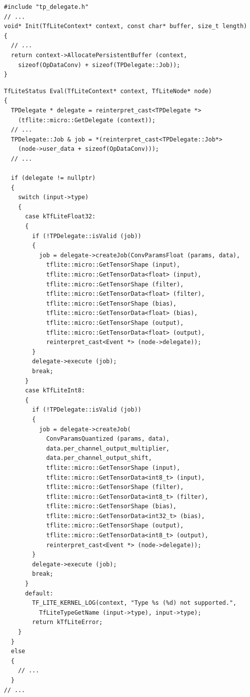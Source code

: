\begin{lstlisting}
#include "tp_delegate.h"
// ...
void* Init(TfLiteContext* context, const char* buffer, size_t length)
{
  // ...
  return context->AllocatePersistentBuffer (context, 
    sizeof(OpDataConv) + sizeof(TPDelegate::Job));
}
\end{lstlisting}

\begin{lstlisting}
TfLiteStatus Eval(TfLiteContext* context, TfLiteNode* node)
{
  TPDelegate * delegate = reinterpret_cast<TPDelegate *>
    (tflite::micro::GetDelegate (context));
  // ...
  TPDelegate::Job & job = *(reinterpret_cast<TPDelegate::Job*>
    (node->user_data + sizeof(OpDataConv)));
  // ...
  
  if (delegate != nullptr)
  {
    switch (input->type)
    {
      case kTfLiteFloat32:
      {
        if (!TPDelegate::isValid (job))
        {
          job = delegate->createJob(ConvParamsFloat (params, data),
            tflite::micro::GetTensorShape (input),
            tflite::micro::GetTensorData<float> (input),
            tflite::micro::GetTensorShape (filter),
            tflite::micro::GetTensorData<float> (filter),
            tflite::micro::GetTensorShape (bias),
            tflite::micro::GetTensorData<float> (bias),
            tflite::micro::GetTensorShape (output),
            tflite::micro::GetTensorData<float> (output),
            reinterpret_cast<Event *> (node->delegate));
        }
        delegate->execute (job);
        break;
      }
      case kTfLiteInt8:
      {
        if (!TPDelegate::isValid (job))
        {
          job = delegate->createJob(
            ConvParamsQuantized (params, data),
            data.per_channel_output_multiplier,
            data.per_channel_output_shift,
            tflite::micro::GetTensorShape (input),
            tflite::micro::GetTensorData<int8_t> (input),
            tflite::micro::GetTensorShape (filter),
            tflite::micro::GetTensorData<int8_t> (filter),
            tflite::micro::GetTensorShape (bias),
            tflite::micro::GetTensorData<int32_t> (bias),
            tflite::micro::GetTensorShape (output),
            tflite::micro::GetTensorData<int8_t> (output),
            reinterpret_cast<Event *> (node->delegate));
        }
        delegate->execute (job);
        break;
      }
      default:
        TF_LITE_KERNEL_LOG(context, "Type %s (%d) not supported.",
          TfLiteTypeGetName (input->type), input->type);
        return kTfLiteError;
    }
  }
  else
  {
    // ...
  }
// ...
\end{lstlisting}

